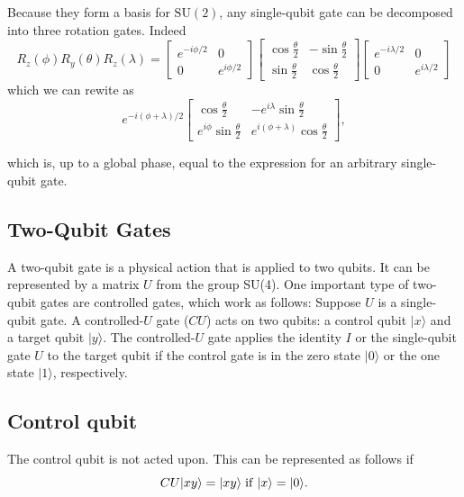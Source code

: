 \documentclass[%
oneside,                 %
final,                   %
10pt]{article}
\begin{document}
Because they form a basis for $\mathrm{SU}(2)$, any single-qubit gate
can be decomposed into three rotation gates. Indeed
\[
R_z(\phi)R_y(\theta)R_z(\lambda)=
\begin{bmatrix}
e^{-i\phi/2} & 0 \\
0 & e^{i\phi/2}
\end{bmatrix}
\begin{bmatrix}
\cos\frac{\theta}{2} & -\sin\frac{\theta}{2} \\
\sin\frac{\theta}{2} & \cos\frac{\theta}{2} 
\end{bmatrix}
\begin{bmatrix}
e^{-i\lambda/2} & 0 \\
0 & e^{i\lambda/2}
\end{bmatrix}
\]
which we can rewite as
\[
e^{-i(\phi+\lambda)/2}
\begin{bmatrix}
\cos\frac{\theta}{2} & -e^{i\lambda}\sin\frac{\theta}{2}\\
e^{i\phi}\sin\frac{\theta}{2} & e^{i(\phi+\lambda)}\cos\frac{\theta}{2}
\end{bmatrix},
\]

which is, up to a global phase, equal to the expression for an arbitrary single-qubit gate.

\subsection{Two-Qubit Gates}

A two-qubit gate is a physical action that is applied to two
qubits. It can be represented by a matrix $U$ from the group
SU(4). One important type of two-qubit gates are controlled gates,
which work as follows: Suppose $U$ is a single-qubit gate. A
controlled-$U$ gate ($CU$) acts on two qubits: a control qubit
$\vert x \rangle $ and a target qubit $\vert y \rangle $. The controlled-$U$ gate
applies the identity $I$ or the single-qubit gate $U$ to the target
qubit if the control gate is in the zero state $\vert 0\rangle$ or the one
state $\vert 1\rangle$, respectively.

\subsection{Control qubit}
The control qubit is not acted
upon. This can be represented as follows if
\[CU\vert xy\rangle=
\vert xy\rangle \hspace{0.1cm} \mathrm{if} \hspace{0.1cm}  \vert x \rangle =\vert 0\rangle.
\]
\end{document}
